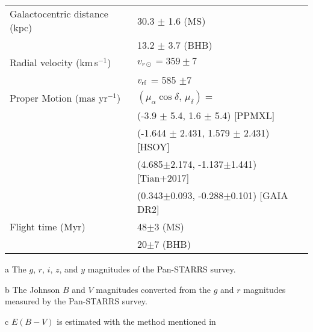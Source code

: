 \documentclass[iop, aj]{emulateapj}
\begin{document}
\begin{table*}
\begin{threeparttable}
\begin{tabular}{ll}
Galactocentric distance (kpc) & 30.3 $ \pm $ 1.6 (MS) \\
                              & 13.2 $ \pm $ 3.7 (BHB) \\

Radial velocity (km\,s$^{-1}$) &  $v_{r\odot} = 359 \pm 7$ \\
                               &  $v_{\rm rf}$ = 585 $\pm 7$ \\

Proper Motion (mas yr$^{-1}$) & $(\mu_\alpha\cos\delta,\, \mu_\delta) = $ \\
                              & (-3.9 $\pm$ 5.4, 1.6 $\pm$ 5.4) [PPMXL] \\
                              & (-1.644 $\pm$ 2.431, 1.579 $\pm$ 2.431) [HSOY] \\
                              & (4.685$\pm$2.174, -1.137$\pm$1.441) [Tian+2017] \\
                              & (0.343$\pm$0.093, -0.288$\pm$0.101) [GAIA DR2] \\
Flight time (Myr) & 48$\pm$3 (MS) \\
                  & 20$\pm$7 (BHB) \\
\hline
\end{tabular}
\begin{tablenotes}
\item[a] The $g$, $r$, $i$, $z$, and $y$ magnitudes of the Pan-STARRS survey.
\item[b] The Johnson $B$ and $V$ magnitudes converted from the $g$ and $r$ magnitudes measured by the Pan-STARRS survey.
\item[c] $E(B-V)$ is estimated with the method mentioned in \citet{2011ApJ...737..103S}
\end{tablenotes}
\end{threeparttable}
\end{table*}
\end{document}
